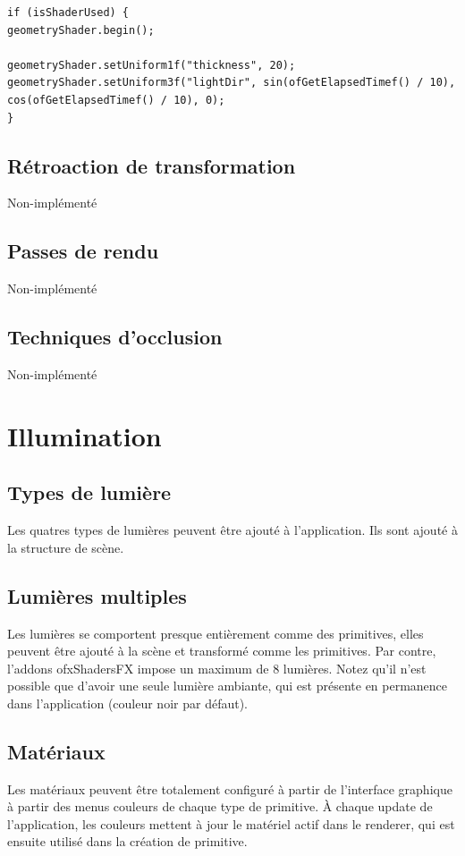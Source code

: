 \begin{lstlisting}
if (isShaderUsed) {
geometryShader.begin();

geometryShader.setUniform1f("thickness", 20);
geometryShader.setUniform3f("lightDir", sin(ofGetElapsedTimef() / 10), cos(ofGetElapsedTimef() / 10), 0);
}
\end{lstlisting}

\subsection{Rétroaction de transformation}
Non-implémenté

\subsection{Passes de rendu}
Non-implémenté

\subsection{Techniques d'occlusion}
Non-implémenté


\pagebreak
\section{Illumination}
\subsection{Types de lumière}
Les quatres types de lumières peuvent être ajouté à l'application. Ils sont ajouté à la structure de scène. 

\subsection{Lumières multiples}
Les lumières se comportent presque entièrement comme des primitives, elles peuvent être ajouté à la scène et transformé comme les primitives. Par contre, l'addons ofxShadersFX impose un maximum de 8 lumières. Notez qu'il n'est possible que d'avoir une seule lumière ambiante, qui est présente en permanence dans l'application (couleur noir par défaut).

\subsection{Matériaux}
Les matériaux peuvent être totalement configuré à partir de l'interface graphique à partir des menus couleurs de chaque type de primitive. À chaque update de l'application, les couleurs mettent à jour le matériel actif dans le renderer, qui est ensuite utilisé dans la création de primitive.

